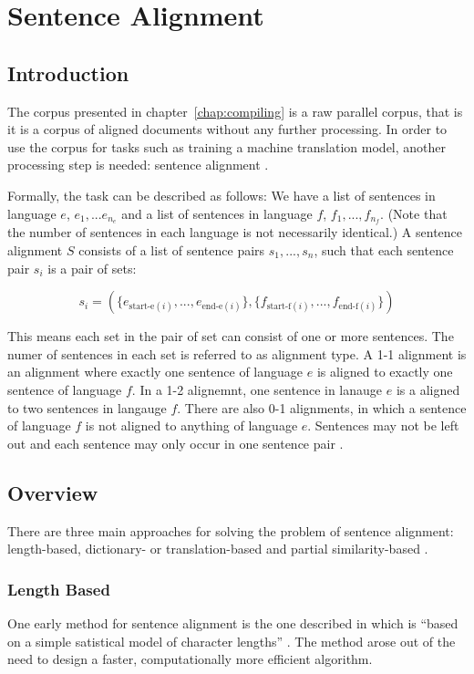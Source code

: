 \chapter{Sentence Alignment}

\section{Introduction}

The corpus presented in chapter~\ref{chap:compiling} is a raw parallel corpus, that is it is a corpus of aligned documents without any further processing. 
In order to use the corpus for tasks such as training a machine translation model, another processing step is needed: sentence alignment \autocite[55]{koehn2009}.

Formally, the task can be described as follows: We have a list of sentences in language \(e\), \(e_1,...e_{n_e}\) and a list of sentences in language \(f\), \(f_1,...,f_{n_f}\). 
(Note that the number of sentences in each language is not necessarily identical.) 
A sentence alignment \(S\) consists of a list of sentence pairs \(s_1, ..., s_n\), such that each sentence pair \(s_i\) is a pair of sets:

\[
	s_i = ( \{ e_{\text{start-e}(i)},... , e_{\text{end-e}(i)}\}, \{f_{\text{start-f}(i)},... , f_{\text{end-f}(i)}\} )
\]
\autocite[56]{koehn2009}

This means each set in the pair of set can consist of one or more sentences. 
The numer of sentences in each set is referred to as alignment type. 
A 1-1 alignment is an alignment where exactly one sentence of language \(e\)
is aligned to exactly one sentence of language \(f\). 
In a 1-2 alignemnt, one sentence in lanauge \(e\) is a aligned to two sentences in langauge \(f\). 
There are also 0-1 alignments, in which a sentence of language \(f\) is not aligned to anything of language \(e\). 
Sentences may not be left out and each sentence may only occur in one sentence pair \autocite[57]{koehn2009}. 


\section{Overview}
There are three main approaches for solving the problem of sentence alignment:  length-based, dictionary- or translation-based and partial similarity-based \autocite{hunalign}. 

\subsection{Length Based}
One early method for sentence alignment is the one described in \cite{gale-church-1991-program} which is \enquote{based on a simple satistical model of character lengths} \autocite{gale-church-1991-program}. The method arose out of the need to design a faster, computationally more efficient algorithm\footnotemark.

